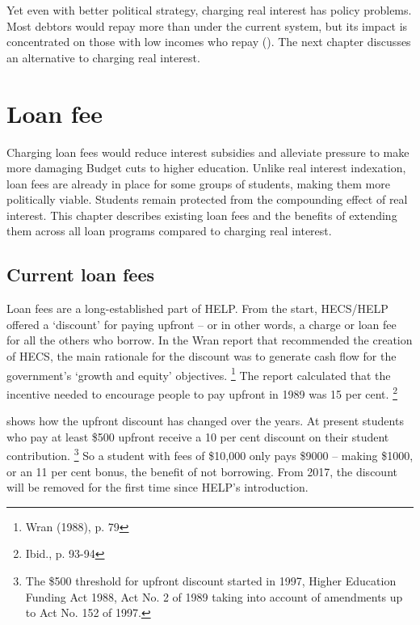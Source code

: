 \documentclass[embargoed]{grattan}
\begin{document}
Yet even with better political strategy, charging real interest has policy problems.
Most debtors would repay more than under the current system, but its impact is concentrated on those with low incomes who repay ().
The next chapter discusses an alternative to charging real interest.

\chapter{Loan fee}\label{chap:6-loan-fee}

Charging loan fees would reduce interest subsidies and alleviate pressure to make more damaging Budget cuts to higher education.
Unlike real interest indexation, loan fees are already in place for some groups of students, making them more politically viable.
Students remain protected from the compounding effect of real interest.
This chapter describes existing loan fees and the benefits of extending them across all loan programs compared to charging real interest.

\section{Current loan fees}\label{sec:current-loan-fees}

Loan fees are a long-established part of \gls{HELP}.
From the start, \gls{HECS}/\gls{HELP} offered a `discount' for paying upfront -- or in other words, a charge or loan fee for all the others who borrow.
In the Wran report that recommended the creation of \gls{HECS}, the main rationale for the discount was to generate cash flow for the government's `growth and equity' objectives.%
\footnote{Wran (1988), p. 79} The report calculated that the incentive needed to encourage people to pay upfront in 1989 was 15 per cent.%
\footnote{Ibid., p. 93-94}

 shows how the upfront discount has changed over the years.
At present students who pay at least \$500 upfront receive a 10 per cent discount on their student contribution.%
\footnote{The \$500 threshold for upfront discount started in 1997, Higher Education Funding Act 1988, Act No. 2 of 1989 taking into account of amendments up to Act No. 152 of 1997.} So a student with fees of \$10,000 only pays \$9000 -- making \$1000, or an 11 per cent bonus, the benefit of not borrowing.
From 2017, the discount will be removed for the first time since \gls{HELP}'s introduction.
\end{document}

